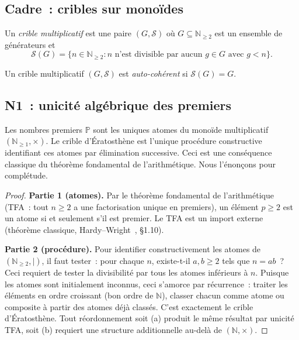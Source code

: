 \documentclass[12pt,a4paper]{article}
\begin{document}
\subsection{Cadre~: cribles sur monoïdes}
\label{sec:ch2_setup}

\begin{definition}
\label{def:mult_sieve}
Un \emph{crible multiplicatif} est une paire $(G, \mathcal{S})$ où
$G \subseteq \mathbb{N}_{\geq 2}$ est un ensemble de générateurs et
\[
  \mathcal{S}(G) = \{n \in \mathbb{N}_{\geq 2} :
    n \text{ n'est divisible par aucun } g \in G \text{ avec } g < n\}.
\]
\end{definition}

\begin{definition}
\label{def:self_consistent}
Un crible multiplicatif $(G, \mathcal{S})$ est \emph{auto-cohérent}
si $\mathcal{S}(G) = G$.
\end{definition}

\subsection{N1~: unicité algébrique des premiers}
\label{sec:N1}

\mTHM
\begin{theoreme}
\label{thm:N1}
Les nombres premiers $\mathbb{P}$ sont les uniques atomes du monoïde
multiplicatif $(\mathbb{N}_{\geq 1}, \times)$. Le crible d'Ératosthène
est l'unique procédure constructive identifiant ces atomes par
élimination successive.
Ceci est une conséquence classique du théorème fondamental de
l'arithmétique. Nous l'énonçons pour complétude.

\begin{proof}
\textbf{Partie 1 (atomes).} Par le théorème fondamental de
l'arithmétique (TFA~: tout $n \geq 2$ a une factorisation unique en
premiers), un élément $p \geq 2$ est un atome si et seulement s'il
est premier. Le TFA est un import externe (théorème classique,
Hardy--Wright~\cite{HardyWright2008}, \S1.10).

\textbf{Partie 2 (procédure).} Pour identifier constructivement les
atomes de $(\mathbb{N}_{\geq 2},|)$, il faut tester~: pour chaque $n$,
existe-t-il $a, b \geq 2$ tels que $n = ab$~? Ceci requiert de tester
la divisibilité par tous les atomes inférieurs à $n$. Puisque les
atomes sont initialement inconnus, ceci s'amorce par récurrence~:
traiter les éléments en ordre croissant (bon ordre de $\mathbb{N}$),
classer chacun comme atome ou composite à partir des atomes déjà
classés. C'est exactement le crible d'Ératosthène. Tout réordonnement
soit (a) produit le même résultat par unicité TFA, soit (b) requiert
une structure additionnelle au-delà de $(\mathbb{N}, \times)$.
\end{proof}
\end{theoreme}
\end{document}
